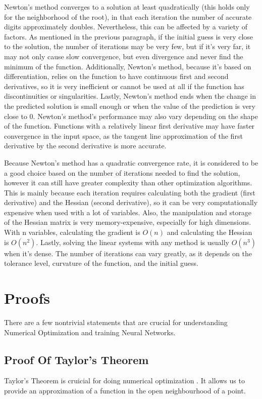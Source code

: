 \documentclass[10pt]{article}
\begin{document}
Newton’s method converges to a solution at least quadratically (this holds only for the neighborhood of the root)\cite{geeksforgeeks-2024-newtons}, in that each iteration the number of accurate digits approximately doubles. Nevertheless, this can be affected by a variety of factors. As mentioned in the previous paragraph, if the initial guess is very close to the solution, the number of iterations may be very few, but if it’s very far, it may not only cause slow convergence, but even divergence and never find the minimum of the function. Additionally, Newton’s method, because it’s based on differentiation, relies on the function to have continuous first and second derivatives, so it is very inefficient or cannot be used at all if the function has discontinuities or singularities. Lastly, Newton’s method ends when the change in the predicted solution is small enough or when the value of the prediction is very close to 0. Newton’s method’s performance may also vary depending on the shape of the function. Functions with a relatively linear first derivative may have faster convergence in the input space, as the tangent line approximation of the first derivative by the second derivative is more accurate.

Because Newton’s method has a quadratic convergence rate, it is considered to be a good choice based on the number of iterations needed to find the solution, however it can still have greater complexity than other optimization algorithms. This is mainly because each iteration requires calculating both the gradient (first derivative) and the Hessian (second derivative), so it can be very computationally expensive when used with a lot of variables. Also, the manipulation and storage of the Hessian matrix is very memory-expensive, especially for high dimensions. With n variables, calculating the gradient is $O(n)$ and calculating the Hessian is $O(n^2)$. Lastly, solving the linear systems with any method is usually $O(n^3)$ when it’s dense. The number of iterations can vary greatly, as it depends on the tolerance level, curvature of the function, and the initial guess.

\section{Proofs}
There are a few nontrivial statements that are crucial for understanding Numerical Optimization and training Neural Networks.
\subsection{Proof Of Taylor's Theorem}
Taylor's Theorem is cruicial for doing numerical optimization \cite{recht-wright}. It allows us to provide an approximation of a function in the open neighbourhood of a point.
\end{document}
